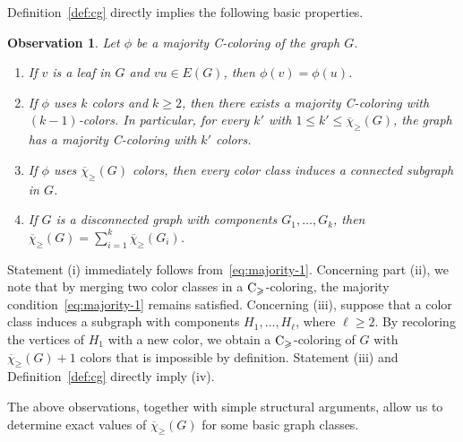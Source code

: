 \documentclass{article}
\newtheorem{observation}[theorem]{Observation}
\theoremstyle{definition}
\newcommand{\mc}{\overline{\chi}_{\geqslant}}
\newcommand{\cg}{{\rm C}_{\geqslant}}
\begin{document}
Definition~\ref{def:cg} directly implies the following basic properties.
\begin{observation} \label{obs:basic} Let $\phi$ be a majority C-coloring of the graph $G$.
\begin{enumerate}[label=\normalfont(\roman*)]
    \item If $v$ is a leaf in $G$ and $vu \in E(G)$, then $\phi(v)=\phi(u)$.  
    \item If $\phi$ uses $k$ colors and $k \ge 2$, then there exists a majority C-coloring with $(k-1)$-colors. In particular, for every $k'$ with $1 \leq k' \leq \mc(G)$, the graph has a majority C-coloring with $k'$ colors.
    \item If $\phi$ uses $\mc(G)$ colors, then every color class induces a connected subgraph in $G$.
    \item If  $G$ is a disconnected graph with components $G_1, \dots, G_k$, then $\mc(G)= \sum_{i=1}^k \mc(G_i)$.
\end{enumerate}   
\end{observation}
Statement (i) immediately follows from~\eqref{eq:majority-1}. Concerning part (ii), we note that by merging two color classes in a $\cg$-coloring, the majority condition~\eqref{eq:majority-1} remains satisfied. Concerning (iii), suppose that a color class induces a subgraph with components $H_1, \dots , H_{\ell}$, where $\ell \ge 2$. By recoloring the vertices of $H_1$ with a new color, we obtain a $\cg$-coloring of $G$ with $\mc(G)+1$ colors that is impossible by definition. Statement (iii) and Definition~\ref{def:cg} directly imply (iv).  


\vspace{5mm} %

The above observations, together with simple structural arguments, allow us to determine exact values of $\mc(G)$ for some basic graph classes. %
\end{document}

